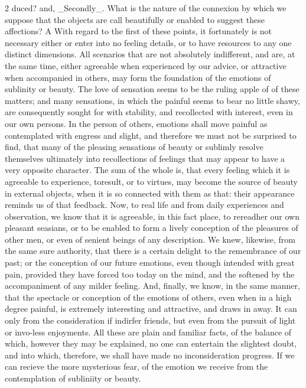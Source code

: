 \documentclass[10pt]{article}
\begin{document}
\begin{multicols}{2}\raggedcolumns
duced? and, \_Secondly\_. What is the nature of the connexion by which we suppose that the objects are call beautifully or enabled to suggest these affections? A With regard to the first of these points, it fortunately is not necessary either or enter into no feeling details, or to have resources to any one distinct dimensions. All scenarios that are not absolutely indifferent, and are, at the same time, either agreeable when experienced by our advice, or attractive when accompanied in others, may form the foundation of the emotions of sublinity or beauty. The love of sensation seems to be the ruling apple of of these matters; and many sensations, in which the painful seems to bear no little shawy, are consequently sought for with stability, and recollected with interest, even in our own persons. In the person of others, emotions shall move painful as contemplated with engress and slight, and therefore we must not be surprised to find, that many of the pleasing sensations of beauty or sublimly resolve themselves ultimately into recollections of feelings that may appear to have a very opposite character. The sum of the whole is, that every feeling which it is agreeable to experience, toresult, or to virtues, may become the source of beauty in external objects, when it is so connected with them as that: their appearance reminds us of that feedback. Now, to real life and from daily experiences and observation, we know that it is agreeable, in this fact place, to rereadher our own pleasant seasians, or to be enabled to form a lively conception of the pleasures of other men, or even of senient beings of any description. We knew, likewise, from the same sure authority, that there is a certain delight to the remembrance of our past; or the conception of our future emotions, even though intended with great pain, provided they have forced too today on the mind, and the softened by the accompaniment of any milder feeling. And, finally, we know, in the same manner, that the spectacle or conception of the emotions of others, even when in a high degree painful, is extremely interesting and attractive, and draws in away. It can only from the consideration if indirfer friends, but even from the pursuit of light or invo-less enjoyments. All these are plain and familiar facts, of the balance of which, however they may be explained, no one can entertain the slightest doubt, and into which, therefore, we shall have made no inconsideration progress. If we can recieve the more mysterious fear, of the emotion we receive from the contemplation of subliniity or beauty.


\end{multicols}
\end{document}
